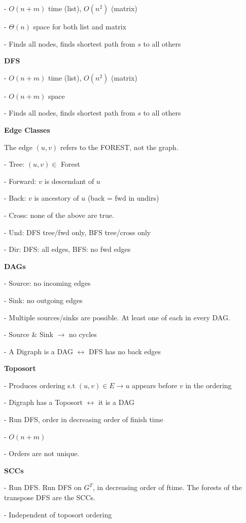 \documentclass[8pt, letterpaper]{extarticle}
\begin{document}
\begin{minipage}[t]{0.45\textwidth}
- $O(n + m)$ time (list), $O(n^2)$ (matrix)

- $\Theta(n)$ space for both list and matrix

- Finds all nodes, finds shortest path from $s$ to all others

\textbf{DFS}

- $O(n + m)$ time (list), $O(n^2)$ (matrix)

- $O(n + m)$ space

- Finds all nodes, finds shortest path from $s$ to all others

\textbf{Edge Classes}

The edge $(u, v)$ refers to the FOREST, not the graph.

- Tree: $(u, v) \in$ Forest

- Forward: $v$ is descendant of $u$

- Back: $v$ is ancestory of $u$ (back = fwd in undirs)

- Cross: none of the above are true.

- Und: DFS tree/fwd only, BFS tree/cross only

- Dir: DFS: all edges, BFS: no fwd edges


\textbf{DAGs}

- Source: no incoming edges

- Sink: no outgoing edges

- Multiple sources/sinks are possible. At least one of each in every DAG.

- Source \& Sink $\rightarrow$ no cycles

- A Digraph is a DAG $\leftrightarrow$ DFS has no back edges


\textbf{Toposort}

- Produces ordering s.t $(u,v) \in E \rightarrow u$ appears before $v$ in the ordering

- Digraph has a Toposort $\leftrightarrow$ it is a DAG

- Run DFS, order in decreasing order of finish time

- $O(n + m)$

- Orders are not unique.


\textbf{SCCs}

- Run DFS. Run DFS on $G^T$, in decreasing order of ftime. The forests of the transpose DFS are the SCCs.

- Independent of toposort ordering

\end{minipage}
\vline
\hspace{1pt}
\end{document}
